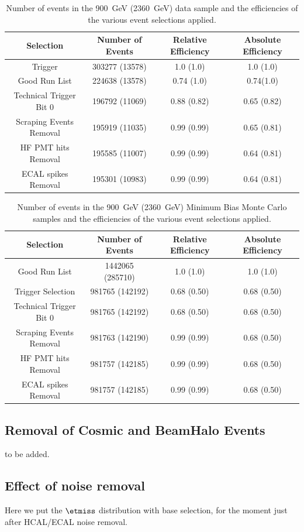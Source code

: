 \begin{table}[!ht]
  \begin{center}
    \begin{tabular}{|c|c|c|c|}
      \hline
      Selection      & Number of Events  & Relative Efficiency   &
      Absolute Efficiency\\
      \hline\hline
      Trigger                            & 303277 (13578) & 1.0 (1.0)&1.0 (1.0) \\ 
      Good Run List                 & 224638 (13578) & 0.74 (1.0) & 0.74(1.0)  \\
      Technical Trigger Bit 0    & 196792 (11069) & 0.88 (0.82) & 0.65 (0.82)\\
      Scraping Events Removal& 195919 (11035) & 0.99 (0.99) & 0.65 (0.81) \\
      HF PMT hits Removal      & 195585 (11007) & 0.99 (0.99) & 0.64 (0.81)\\
      ECAL spikes Removal     & 195301 (10983) & 0.99 (0.99) & 0.64 (0.81) \\ \hline
  \end{tabular}
    \caption{Number of events in the 900~GeV (2360~GeV) data sample and
      the efficiencies of the various event selections applied.}
    \label{tab:Higgssamples}
  \end{center}
\end{table}

\begin{table}[!ht]
  \begin{center}
    \begin{tabular}{|c|c|c|c|}
      \hline
      Selection      & Number of Events  & Relative Efficiency   &
      Absolute Efficiency\\
      \hline\hline
      Good Run List                 & 1442065 (285710) & 1.0 (1.0) & 1.0 (1.0)  \\
      Trigger Selection             & 981765 (142192) & 0.68 (0.50)& 0.68 (0.50) \\ 
      Technical Trigger Bit 0    & 981765 (142192) & 0.68 (0.50) & 0.68 (0.50)\\
      Scraping Events Removal& 981763 (142190) & 0.99 (0.99) & 0.68 (0.50) \\
      HF PMT hits Removal      & 981757 (142185) & 0.99 (0.99) & 0.68 (0.50)\\
      ECAL spikes Removal     & 981757 (142185) & 0.99 (0.99) & 0.68 (0.50) \\ \hline
    \end{tabular}
    \caption{Number of events in the 900~GeV (2360~GeV) Minimum Bias
      Monte Carlo samples and the efficiencies of the various event
      selections applied.}
    \label{tab:Higgssamples}
  \end{center}
\end{table}

\subsection{Removal of Cosmic and BeamHalo Events}
to be added.

\subsection{Effect of noise removal}
Here we put the $\etmiss$ distribution with base selection, for the moment just 
after HCAL/ECAL noise removal.

\clearpage
